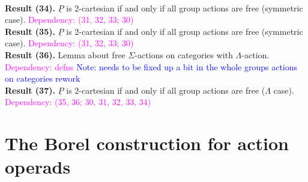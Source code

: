 \documentclass{amsart}
\begin{document}
\\ \textbf{Result (34).} $\underline{P}$ is 2-cartesian if and only if all group actions are free (symmetric case). \textcolor{magenta}{Dependency: (31, 32, 33; 30)} 
\\ \textbf{Result (35).} $\underline{P}$ is 2-cartesian if and only if all group actions are free (symmetric case). \textcolor{magenta}{Dependency: (31, 32, 33; 30)} 
\\ \textbf{Result (36).} Lemma about free $\Sigma$-actions on categories with $\Lambda$-action. \textcolor{magenta}{Dependency: defns} \textcolor{blue}{Note: needs to be fixed up a bit in the whole groups actions on categories rework}
\\ \textbf{Result (37).} $\underline{P}$ is 2-cartesian if and only if all group actions are free ($\Lambda$ case). \textcolor{magenta}{Dependency: (35, 36; 30, 31, 32, 33, 34)} 


\section{The Borel construction for action operads}
\end{document}
